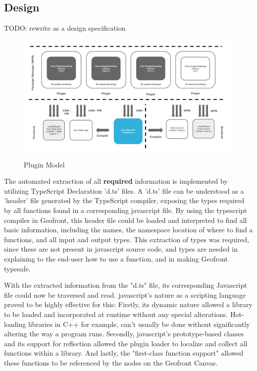 \subsection{Design}

\begin{note}
  TODO: rewrite as a design specification
\end{note}

\begin{figure}
  \centering
  \graphicspath{ {../../assets/diagrams/} }
  \includegraphics[width=\linewidth]{Model Proposal.png}
  \caption{Plugin Model}
  \label{fig:plugin-model}
\end{figure}

The automated extraction of all \textbf{required} information is implemented by utilizing TypeScript Declaration 'd.ts' files. 
A 'd.ts' file can be understood as a 'header' file generated by the TypeScript compiler, exposing the types required by all functions found in a corresponding javascript file.
By using the typescript compiler in Geofront, this header file could be loaded and interpreted to find all basic information, including the names, the namespace location of where to find a functions, and all input and output types.
This extraction of types was required, since these are not present in javascript source code, and types are needed in explaining to the end-user how to use a function, and in making Geofront typesafe.

With the extracted information from the "d.ts" file, its corresponding Javascript file could now be traversed and read.
javascript's nature as a scripting language proved to be highly effective for this:
Firstly, its dynamic nature allowed a library to be loaded and incorporated at runtime without any special alterations. 
Hot-loading libraries in C++ for example, can't usually be done without significantly altering the way a program runs. 
Secondly, javascript's prototype-based classes and its support for reflection allowed the plugin loader to localize and collect all functions within a library.
And lastly, the "first-class function support" allowed these functions to be referenced by the nodes on the Geofront Canvas. 


